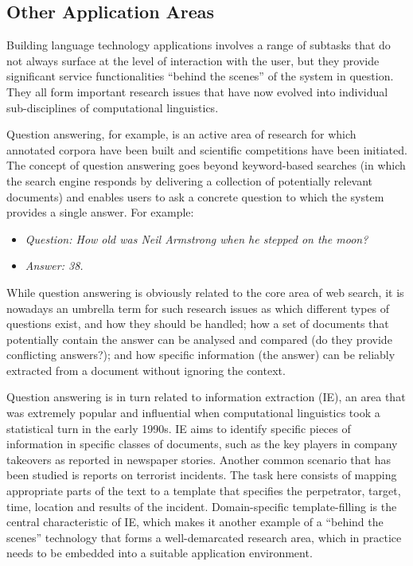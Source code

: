 {\begin{multicols}{2}
 \subsection {Other Application Areas}

Building language technology applications involves a range of subtasks that do not always surface at the level of interaction with the user, but they provide significant service functionalities “behind the scenes” of the system in question. They all form important research issues that have now evolved into individual sub-disciplines of computational linguistics. 

Question answering, for example, is an active area of research for which annotated corpora have been built and scientific competitions have been initiated. The concept of question answering goes beyond keyword-based searches (in which the search engine responds by delivering a collection of potentially relevant documents) and enables users to ask a concrete question to which the system provides a single answer. For example:

\begin{itemize}
\item[] \textit{Question: How old was Neil Armstrong when he stepped on the moon?}
\item[] \textit{Answer: 38.}
\end{itemize}

While question answering is obviously related to the core area of web search, it is nowadays an umbrella term for such research issues as which different types of questions exist, and how they should be handled; how a set of documents that potentially contain the answer can be analysed and compared (do they provide conflicting answers?); and how specific information (the answer) can be reliably extracted from a document without ignoring the context.    


Question answering is in turn related to information extraction (IE), an area that was extremely popular and influential when computational linguistics took a statistical turn in the early 1990s. IE aims to identify specific pieces of information in specific classes of documents, such as the key players in company takeovers as reported in newspaper stories. Another common scenario that has been studied is reports on terrorist incidents. The task here consists of mapping appropriate parts of the text to a template that specifies the perpetrator, target, time, location and results of the incident. Domain-specific template-filling is the central characteristic of IE, which makes it another example of a “behind the scenes” technology that forms a well-demarcated research area, which in practice needs to be embedded into a suitable application environment.


\end{multicols}}
